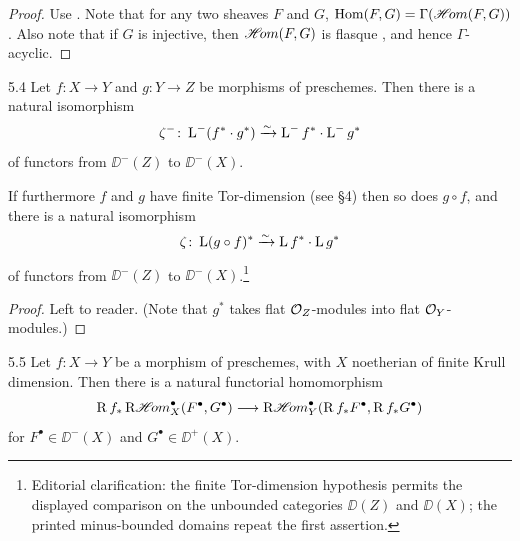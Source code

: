 \begin{proof}
\begingroup\setlength{\emergencystretch}{2em}
Use . Note that for any two sheaves $F$ and $G$, $\operatorname{Hom}(F,G)=\Gamma(\mathop{\mathscr{H}\!om}\nolimits(F,G))$. Also note that if $G$ is injective, then $\mathop{\mathscr{H}\!om}\nolimits(F,G)$ is flasque \cite[\nopp II,~7.3.2]{G}, and hence $\Gamma$-acyclic.
\end{proof}\par\endgroup

\begin{bookproposition}{5.4}\label{prop:2.5.4}
Let $f\colon X\to Y$ and $g\colon Y\to Z$ be morphisms of preschemes. Then there is a natural isomorphism
\[
\zeta^-\colon \operatorname{L}^-(f^*\cdot g^*) \xrightarrow{\sim} \operatorname{L}^-f^*\cdot \operatorname{L}^-g^*
\]
of functors from $\DD^-(Z)$ to $\DD^-(X)$.

If furthermore $f$ and $g$ have finite Tor-dimension (see \S4) then so does $g\circ f$, and there is a natural isomorphism
\[
\zeta\colon \operatorname{L}(g\circ f)^* \xrightarrow{\sim} \operatorname{L} f^*\cdot \operatorname{L} g^*
\]
of functors from $\DD^-(Z)$ to $\DD^-(X)$.\footnote{Editorial clarification: the finite Tor-dimension hypothesis permits the displayed comparison on the unbounded categories $\DD(Z)$ and $\DD(X)$; the printed minus-bounded domains repeat the first assertion.}
\end{bookproposition}

\begin{proof}
Left to reader. (Note that $g^*$ takes flat $\mathcal{O}_Z$-modules into flat $\mathcal{O}_Y$-modules.)
\end{proof}

\begin{bookproposition}{5.5}\label{prop:2.5.5}
Let $f\colon X\to Y$ be a morphism of preschemes, with $X$ noetherian of finite Krull dimension. Then there is a natural functorial homomorphism
\[
\operatorname{R} f_* \mathop{\mathrm{R}\mathscr{H}\!om}\nolimits^\bullet_X(F^\bullet,G^\bullet) \longrightarrow \mathop{\mathrm{R}\mathscr{H}\!om}\nolimits^\bullet_Y(\operatorname{R} f_*F^\bullet,\operatorname{R} f_*G^\bullet)
\]
for $F^\bullet\in\DD^-(X)$ and $G^\bullet\in\DD^+(X)$.
\end{bookproposition}

